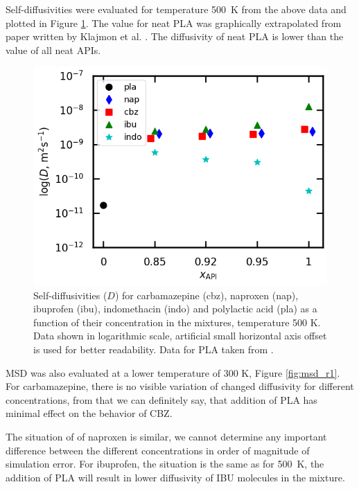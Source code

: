 Self-diffusivities were evaluated for temperature 500~K from the above data and plotted in Figure \ref{fig:d}. The value for neat PLA was graphically extrapolated from paper written by Klajmon et al. \cite{klajmon_glass_2023}. The diffusivity of neat PLA is lower than the value of all neat APIs. 
\begin{figure}[htb!]
	\centering
	\includegraphics[width=0.8\linewidth]{img/d.png} 
	\caption{Self-diffusivities ($D$) for carbamazepine (cbz), naproxen (nap), ibuprofen (ibu), indomethacin (indo) and polylactic acid (pla) as a function of their concentration in the mixtures, temperature 500 K. Data shown in logarithmic scale, artificial small horizontal axis offset is used for better readability. Data for PLA taken from \cite{klajmon_glass_2023}.}
	\label{fig:d}    
\end{figure}  

\newpage
MSD was also evaluated at a lower temperature of 300 K, Figure \ref{fig:msd_r1}. For carbamazepine, there is no visible variation of changed diffusivity for different concentrations, from that we can definitely say, that addition of PLA has minimal effect on the behavior of CBZ. 

The situation of of naproxen is similar, we cannot determine any important difference between the different concentrations in order of magnitude of simulation error. For ibuprofen, the situation is the same as for 500~K, the addition of PLA will result in lower diffusivity of IBU molecules in the mixture. 

